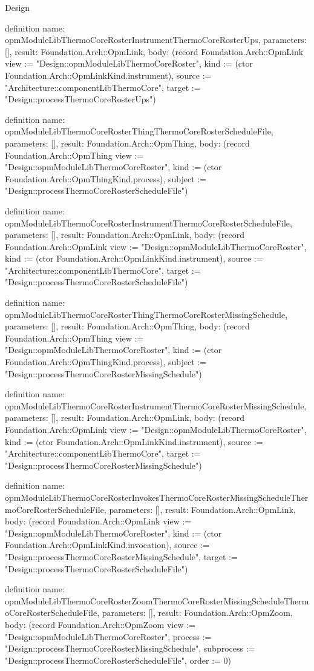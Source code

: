 \begin{lexlean}{Design}
\begin{semanticmodule}
definition{
  name: opmModuleLibThermoCoreRosterInstrumentThermoCoreRosterUps,
  parameters: [],
  result: Foundation.Arch::OpmLink,
  body: (record Foundation.Arch::OpmLink {view := "Design::opmModuleLibThermoCoreRoster", kind := (ctor Foundation.Arch::OpmLinkKind.instrument), source := "Architecture::componentLibThermoCore", target := "Design::processThermoCoreRosterUps"})
}

definition{
  name: opmModuleLibThermoCoreRosterThingThermoCoreRosterScheduleFile,
  parameters: [],
  result: Foundation.Arch::OpmThing,
  body: (record Foundation.Arch::OpmThing {view := "Design::opmModuleLibThermoCoreRoster", kind := (ctor Foundation.Arch::OpmThingKind.process), subject := "Design::processThermoCoreRosterScheduleFile"})
}

definition{
  name: opmModuleLibThermoCoreRosterInstrumentThermoCoreRosterScheduleFile,
  parameters: [],
  result: Foundation.Arch::OpmLink,
  body: (record Foundation.Arch::OpmLink {view := "Design::opmModuleLibThermoCoreRoster", kind := (ctor Foundation.Arch::OpmLinkKind.instrument), source := "Architecture::componentLibThermoCore", target := "Design::processThermoCoreRosterScheduleFile"})
}

definition{
  name: opmModuleLibThermoCoreRosterThingThermoCoreRosterMissingSchedule,
  parameters: [],
  result: Foundation.Arch::OpmThing,
  body: (record Foundation.Arch::OpmThing {view := "Design::opmModuleLibThermoCoreRoster", kind := (ctor Foundation.Arch::OpmThingKind.process), subject := "Design::processThermoCoreRosterMissingSchedule"})
}

definition{
  name: opmModuleLibThermoCoreRosterInstrumentThermoCoreRosterMissingSchedule,
  parameters: [],
  result: Foundation.Arch::OpmLink,
  body: (record Foundation.Arch::OpmLink {view := "Design::opmModuleLibThermoCoreRoster", kind := (ctor Foundation.Arch::OpmLinkKind.instrument), source := "Architecture::componentLibThermoCore", target := "Design::processThermoCoreRosterMissingSchedule"})
}

definition{
  name: opmModuleLibThermoCoreRosterInvokesThermoCoreRosterMissingScheduleThermoCoreRosterScheduleFile,
  parameters: [],
  result: Foundation.Arch::OpmLink,
  body: (record Foundation.Arch::OpmLink {view := "Design::opmModuleLibThermoCoreRoster", kind := (ctor Foundation.Arch::OpmLinkKind.invocation), source := "Design::processThermoCoreRosterMissingSchedule", target := "Design::processThermoCoreRosterScheduleFile"})
}

definition{
  name: opmModuleLibThermoCoreRosterZoomThermoCoreRosterMissingScheduleThermoCoreRosterScheduleFile,
  parameters: [],
  result: Foundation.Arch::OpmZoom,
  body: (record Foundation.Arch::OpmZoom {view := "Design::opmModuleLibThermoCoreRoster", process := "Design::processThermoCoreRosterMissingSchedule", subprocess := "Design::processThermoCoreRosterScheduleFile", order := 0})
}


\end{semanticmodule}
\end{lexlean}
